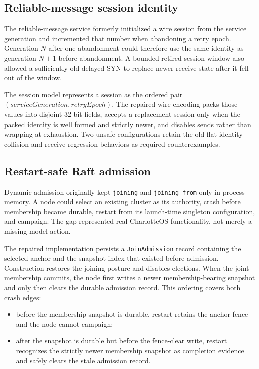 \subsection{Reliable-message session identity}

The reliable-message service formerly initialized a wire session from the
service generation and incremented that number when abandoning a retry epoch.
Generation $N$ after one abandonment could therefore use the same identity as
generation $N+1$ before abandonment. A bounded retired-session window also
allowed a sufficiently old delayed SYN to replace newer receive state after it
fell out of the window.

The session model represents a session as the ordered pair
$(\mathit{serviceGeneration},\mathit{retryEpoch})$. The repaired wire encoding
packs those values into disjoint 32-bit fields, accepts a replacement session
only when the packed identity is well formed and strictly newer, and disables
sends rather than wrapping at exhaustion. Two unsafe configurations retain the
old flat-identity collision and receive-regression behaviors as required
counterexamples.

\subsection{Restart-safe Raft admission}

Dynamic admission originally kept \texttt{joining} and
\texttt{joining\_from} only in process memory. A node could select an existing
cluster as its authority, crash before membership became durable, restart from
its launch-time singleton configuration, and campaign. The gap represented
real CharlotteOS functionality, not merely a missing model action.

The repaired implementation persists a \texttt{JoinAdmission} record
containing the selected anchor and the snapshot index that existed before
admission. Construction restores the joining posture and disables elections.
When the joint membership commits, the node first writes a newer
membership-bearing snapshot and only then clears the durable admission record.
This ordering covers both crash edges:

\begin{itemize}
    \item before the membership snapshot is durable, restart retains the
        anchor fence and the node cannot campaign;
    \item after the snapshot is durable but before the fence-clear write,
        restart recognizes the strictly newer membership snapshot as completion
        evidence and safely clears the stale admission record.
\end{itemize}

